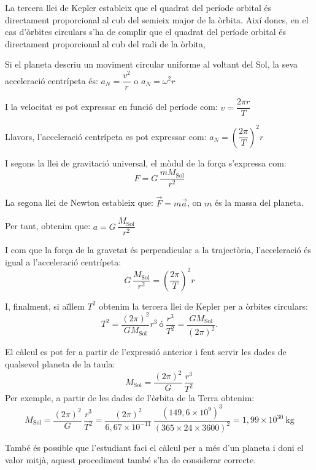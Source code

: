 \begin{solapartat}
 La tercera llei de Kepler estableix que el quadrat del període orbital és
directament proporcional al cub del semieix major de la òrbita. Així doncs, en el cas
d'òrbites circulars s'ha de complir que el quadrat del període orbital és directament
proporcional al cub del radi de la òrbita,

 Si el planeta descriu un moviment circular uniforme al voltant del Sol, la
seva acceleració centrípeta és: $a_N = \dfrac{v^2}{r}$ o $a_N = \omega^2 r$

I la velocitat es pot expressar en funció del període com: $v = \dfrac{2\pi r}{T}$

Llavors, l'acceleració centrípeta es pot expressar com: $a_N = \left(\dfrac{2\pi}{T}\right)^2 r$

 I segons la llei de gravitació universal, el mòdul de la força s'expressa com:
\[ F = G\,\frac{m M_\mathrm{Sol}}{r^2} \]

 La segona llei de Newton estableix que: $\vec{F} = m\vec{a}$, on $m$ és la
massa del planeta.

Per tant, obtenim que: $a = G\,\dfrac{M_\mathrm{Sol}}{r^2}$

 I com que la força de la gravetat és perpendicular a la trajectòria,
l'acceleració és igual a l'acceleració centrípeta:
\[ G\,\frac{M_\mathrm{Sol}}{r^2} = \left(\frac{2\pi}{T}\right)^2 r \]

I, finalment, si aïllem $T^2$ obtenim la tercera llei de Kepler per a òrbites circulars:
\[ T^2 = \frac{(2\pi)^2}{G M_\mathrm{Sol}} r^3 \ \text{ó}\ \frac{r^3}{T^2} = \frac{G M_\mathrm{Sol}}{(2\pi)^2}. \]
\end{solapartat}

\begin{solapartat}
 El càlcul es pot fer a partir de l'expressió anterior i fent servir les dades
de qualsevol planeta de la taula:
\[ M_\mathrm{Sol} = \frac{(2\pi)^2}{G}\,\frac{r^3}{T^2} \]
Per exemple, a partir de les dades de l'òrbita de la Terra obtenim:
\[ M_\mathrm{Sol} = \frac{(2\pi)^2}{G}\,\frac{r^3}{T^2} = \frac{(2\pi)^2}{6,67\times 10^{-11}}\,\frac{(149,6\times 10^{9})^3}{(365\times 24\times 3600)^2} = 1,99\times 10^{30}\ \mathrm{kg} \]

També és possible que l'estudiant faci el càlcul per a més d'un planeta i doni el valor
mitjà, aquest procediment també s'ha de considerar correcte.
\end{solapartat}
